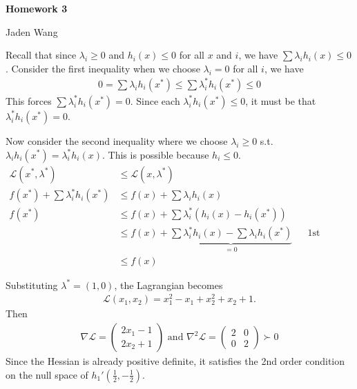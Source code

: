\documentclass[12pt]{article}
\begin{document}
\centerline {\textsf{\textbf{\LARGE{Homework 3}}}}
\centerline {Jaden Wang}
\vspace{.15in}

\begin{problem}[1]
Recall that since $ \lambda_i \geq 0$ and $ h_i(x) \leq 0$ for all $ x$ and  $ i$, we have $ \sum \lambda_i h_i(x) \leq 0$. Consider the first inequality when we choose $ \lambda_i =0$ for all $ i$, we have
\begin{align*}
	0=\sum \lambda_i h_i(x^* ) \leq \sum \lambda_i^* h_i(x^* ) \leq 0
\end{align*}
This forces $ \sum \lambda_i^* h_i(x^* ) = 0$. Since each $ \lambda_i^* h_i(x^* ) \leq 0$, it must be that $ \lambda_i^* h_i(x^* ) = 0$.

Now consider the second inequality where we choose $ \lambda_i \geq 0$ s.t.\ $ \lambda_i h_i(x^* ) = \lambda_i^* h_i(x)$. This is possible because $ h_i \leq 0$.
\begin{align*}
	\mathscr{L}(x^* ,\lambda^* ) &\leq \mathscr{L}(x,\lambda^* )  \\
	f(x^* ) + \sum \lambda_i^* h_i(x^* ) &\leq f(x) + \sum \lambda_ih_i(x)\\
	f(x^* ) &\leq f(x) + \sum \lambda_i^* (h_i(x)-h_i(x^* ))\\
		&\leq f(x) + \underbrace{ \sum \lambda_i^* h_i(x) - \sum \lambda_i h_i(x^* )}_{=0 } && \text{1st inequality} \\
		&\leq f(x)
\end{align*}
\end{problem}

\begin{problem}[2]
Substituting $ \lambda^* =(1,0)$, the Lagrangian becomes
\begin{align*}
	\mathscr{L}(x_1,x_2) = x_1^2-x_1+x_2^2+x_2+1.
\end{align*}
Then
\begin{align*}
	\nabla \mathscr{L} = \begin{pmatrix} 2x_1-1\\2x_2+1 \end{pmatrix} \text{ and } \nabla ^2 \mathscr{L} = \begin{pmatrix} 2&0\\0&2 \end{pmatrix} \succ 0
\end{align*}
Since the Hessian is already positive definite, it satisfies the 2nd order condition on the null space of $ h_1'\left( \frac{1}{2},-\frac{1}{2} \right) $.
\end{problem}
\end{document}
